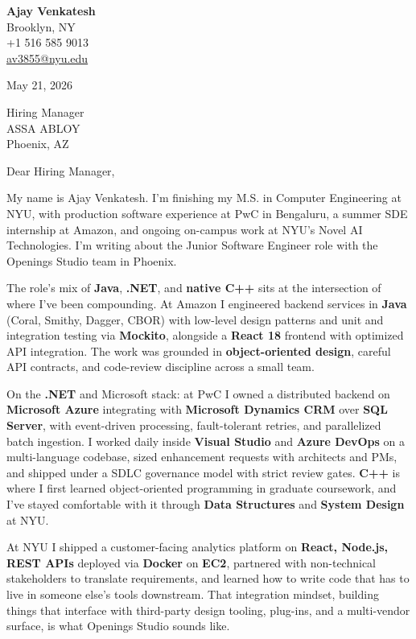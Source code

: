 \documentclass[letterpaper,11pt]{article}
\begin{document}
\begin{flushleft}
\textbf{\large Ajay Venkatesh} \\
Brooklyn, NY \\
+1 516 585 9013 \\
\href{mailto:av3855@nyu.edu}{av3855@nyu.edu}
\end{flushleft}
\vspace{10pt}
May 21, 2026
\vspace{6pt}

Hiring Manager \\
ASSA ABLOY \\
Phoenix, AZ

\vspace{10pt}

Dear Hiring Manager,

My name is Ajay Venkatesh. I'm finishing my M.S. in Computer Engineering at NYU, with production software experience at PwC in Bengaluru, a summer SDE internship at Amazon, and ongoing on-campus work at NYU's Novel AI Technologies. I'm writing about the Junior Software Engineer role with the Openings Studio team in Phoenix.

The role's mix of \textbf{Java}, \textbf{.NET}, and \textbf{native C++} sits at the intersection of where I've been compounding. At Amazon I engineered backend services in \textbf{Java} (Coral, Smithy, Dagger, CBOR) with low-level design patterns and unit and integration testing via \textbf{Mockito}, alongside a \textbf{React 18} frontend with optimized API integration. The work was grounded in \textbf{object-oriented design}, careful API contracts, and code-review discipline across a small team.

On the \textbf{.NET} and Microsoft stack: at PwC I owned a distributed backend on \textbf{Microsoft Azure} integrating with \textbf{Microsoft Dynamics CRM} over \textbf{SQL Server}, with event-driven processing, fault-tolerant retries, and parallelized batch ingestion. I worked daily inside \textbf{Visual Studio} and \textbf{Azure DevOps} on a multi-language codebase, sized enhancement requests with architects and PMs, and shipped under a SDLC governance model with strict review gates. \textbf{C++} is where I first learned object-oriented programming in graduate coursework, and I've stayed comfortable with it through \textbf{Data Structures} and \textbf{System Design} at NYU.

At NYU I shipped a customer-facing analytics platform on \textbf{React, Node.js, REST APIs} deployed via \textbf{Docker} on \textbf{EC2}, partnered with non-technical stakeholders to translate requirements, and learned how to write code that has to live in someone else's tools downstream. That integration mindset, building things that interface with third-party design tooling, plug-ins, and a multi-vendor surface, is what Openings Studio sounds like.
\end{document}
